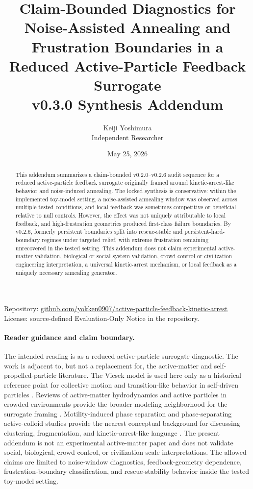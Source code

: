 \documentclass[11pt]{article}
\title{Claim-Bounded Diagnostics for Noise-Assisted Annealing and Frustration Boundaries in a Reduced Active-Particle Feedback Surrogate\\\large v0.3.0 Synthesis Addendum}
\author{Keiji Yoshimura\\\small Independent Researcher}
\date{May 25, 2026}
\begin{document}
\maketitle
\begin{center}
\small
Repository: \href{https://github.com/yokken0907/active-particle-feedback-kinetic-arrest}{github.com/yokken0907/active-particle-feedback-kinetic-arrest}\\
License: source-defined Evaluation-Only Notice in the repository.
\end{center}

\begin{abstract}
This addendum summarizes a claim-bounded v0.2.0--v0.2.6 audit sequence for a reduced active-particle feedback surrogate originally framed around kinetic-arrest-like behavior and noise-induced annealing. The locked synthesis is conservative: within the implemented toy-model setting, a noise-assisted annealing window was observed across multiple tested conditions, and local feedback was sometimes competitive or beneficial relative to null controls. However, the effect was not uniquely attributable to local feedback, and high-frustration geometries produced first-class failure boundaries. By v0.2.6, formerly persistent boundaries split into rescue-stable and persistent-hard-boundary regimes under targeted relief, with extreme frustration remaining unrecovered in the tested setting. This addendum does not claim experimental active-matter validation, biological or social-system validation, crowd-control or civilization-engineering interpretation, a universal kinetic-arrest mechanism, or local feedback as a uniquely necessary annealing generator.
\end{abstract}

\paragraph{Reader guidance and claim boundary.}
The intended reading is as a reduced active-particle surrogate diagnostic. The work is adjacent to, but not a replacement for, the active-matter and self-propelled-particle literature. The Vicsek model is used here only as a historical reference point for collective motion and transition-like behavior in self-driven particles \cite{vicsek1995}. Reviews of active-matter hydrodynamics and active particles in crowded environments provide the broader modeling neighborhood for the surrogate framing \cite{marchetti2013,bechinger2016}. Motility-induced phase separation and phase-separating active-colloid studies provide the nearest conceptual background for discussing clustering, fragmentation, and kinetic-arrest-like language \cite{cates2015,fily2012,redner2013}. The present addendum is not an experimental active-matter paper and does not validate social, biological, crowd-control, or civilization-scale interpretations. The allowed claims are limited to noise-window diagnostics, feedback-geometry dependence, frustration-boundary classification, and rescue-stability behavior inside the tested toy-model setting.
\end{document}
